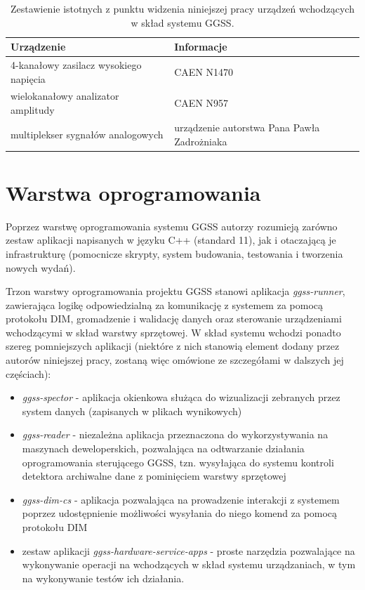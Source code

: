 \begin{table}[htbp]
\centering
\caption{Zestawienie istotnych z punktu widzenia niniejszej pracy urządzeń wchodzących w skład systemu GGSS.}
\label{tab:devices}
\begin{tabularx}{\textwidth}{@{}XX@{}}
\toprule
Urządzenie &
Informacje \\
\midrule
4-kanałowy zasilacz wysokiego napięcia & CAEN N1470 \\
wielokanałowy analizator amplitudy & CAEN N957 \\
multiplekser sygnałów analogowych & urządzenie autorstwa Pana Pawła Zadrożniaka\\
\bottomrule
\end{tabularx}
\end{table}


\section{Warstwa oprogramowania}
Poprzez warstwę oprogramowania systemu GGSS autorzy rozumieją zarówno zestaw aplikacji napisanych w języku C++ (standard 11), jak i otaczającą je infrastrukturę (pomocnicze skrypty, system budowania, testowania i tworzenia nowych wydań). 


Trzon warstwy oprogramowania projektu GGSS stanowi aplikacja \emph{ggss-runner}, zawierająca logikę odpowiedzialną za komunikację z systemem za pomocą protokołu DIM, gromadzenie i walidację danych oraz sterowanie urządzeniami wchodzącymi w skład warstwy sprzętowej. W skład systemu wchodzi ponadto szereg pomniejszych aplikacji (niektóre z nich stanowią element dodany przez autorów niniejszej pracy, zostaną więc omówione ze szczegółami w dalszych jej częściach):
\begin{itemize}
    \item \emph{ggss-spector} - aplikacja okienkowa służąca do wizualizacji zebranych przez system danych (zapisanych w plikach wynikowych)
    \item \emph{ggss-reader} - niezależna aplikacja przeznaczona do wykorzystywania na maszynach deweloperskich, pozwalająca na odtwarzanie działania oprogramowania sterującego GGSS, tzn. wysyłająca do systemu kontroli detektora archiwalne dane z pominięciem warstwy sprzętowej
    \item \emph{ggss-dim-cs} - aplikacja pozwalająca na prowadzenie interakcji z systemem poprzez udostępnienie możliwości wysyłania do niego komend za pomocą protokołu DIM
    \item zestaw aplikacji \emph{ggss-hardware-service-apps} - proste narzędzia pozwalające na wykonywanie operacji na wchodzących w skład systemu urządzaniach, w tym na wykonywanie testów ich działania. 
\end{itemize}


